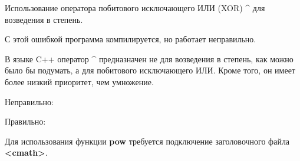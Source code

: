 \begin{typerror}
	Использование оператора побитового исключающего ИЛИ (XOR) \textbf{\^} для возведения в степень.

	С этой ошибкой программа компилируется, но работает неправильно.

	В языке C++ оператор \textbf{\^} предназначен не для возведения в степень, как можно было бы подумать, а для побитового исключающего ИЛИ.
	Кроме того, он имеет более низкий приоритет, чем умножение.

	Неправильно:

	Правильно:

	Для использования функции \textbf{pow} требуется подключение заголовочного файла \textbf{<cmath>}.
\end{typerror}
